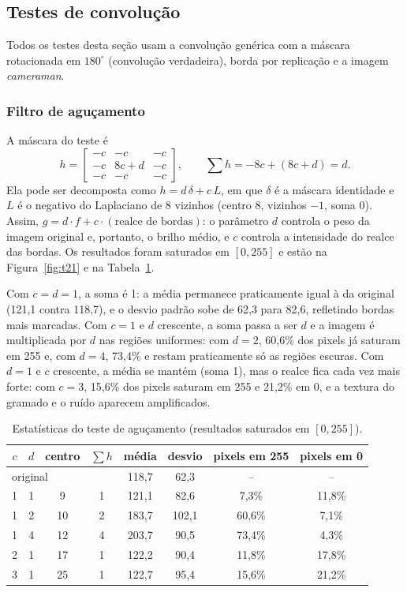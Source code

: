 \documentclass[11pt,a4paper]{article}
\begin{document}
\subsection{Testes de convolução}

Todos os testes desta seção usam a convolução genérica com a máscara rotacionada em
$180^\circ$ (convolução verdadeira), borda por replicação e a imagem \textit{cameraman}.

\subsubsection{Filtro de aguçamento}

A máscara do teste é
\begin{equation}
  h = \begin{bmatrix} -c & -c & -c \\ -c & 8c + d & -c \\ -c & -c & -c \end{bmatrix},
  \qquad \sum h = -8c + (8c + d) = d.
\end{equation}
Ela pode ser decomposta como $h = d\,\delta + c\,L$, em que $\delta$ é a máscara identidade e
$L$ é o negativo do Laplaciano de 8 vizinhos (centro 8, vizinhos $-1$, soma 0). Assim,
$g = d \cdot f + c \cdot (\text{realce de bordas})$: o parâmetro $d$ controla o peso da imagem
original e, portanto, o brilho médio, e $c$ controla a intensidade do realce das bordas. Os
resultados foram saturados em $[0, 255]$ e estão na Figura~\ref{fig:t21} e na
Tabela~\ref{tab:t21}.

Com $c = d = 1$, a soma é 1: a média permanece praticamente igual à da original (121,1 contra
118,7), e o desvio padrão sobe de 62,3 para 82,6, refletindo bordas mais marcadas. Com
$c = 1$ e $d$ crescente, a soma passa a ser $d$ e a imagem é multiplicada por $d$ nas regiões
uniformes: com $d = 2$, 60,6\% dos pixels já saturam em 255 e, com $d = 4$, 73,4\% e restam praticamente só as regiões
escuras. Com $d = 1$ e $c$ crescente, a média se mantém (soma 1), mas o realce fica cada vez
mais forte: com $c = 3$, 15,6\% dos pixels saturam em 255 e 21,2\% em 0, e a textura do
gramado e o ruído aparecem amplificados.

\begin{table}[H]
\centering
\small
\begin{tabular}{cccccccc}
\toprule
$c$ & $d$ & centro & $\sum h$ & média & desvio & pixels em 255 & pixels em 0 \\
\midrule
\multicolumn{4}{l}{original} & 118,7 & 62,3 & -- & -- \\
1 & 1 & 9  & 1 & 121,1 & 82,6  & 7,3\%  & 11,8\% \\
1 & 2 & 10 & 2 & 183,7 & 102,1 & 60,6\% & 7,1\% \\
1 & 4 & 12 & 4 & 203,7 & 90,5  & 73,4\% & 4,3\% \\
2 & 1 & 17 & 1 & 122,2 & 90,4  & 11,8\% & 17,8\% \\
3 & 1 & 25 & 1 & 122,7 & 95,4  & 15,6\% & 21,2\% \\
\bottomrule
\end{tabular}
\caption{Estatísticas do teste de aguçamento (resultados saturados em $[0,255]$).}
\label{tab:t21}
\end{table}
\end{document}
